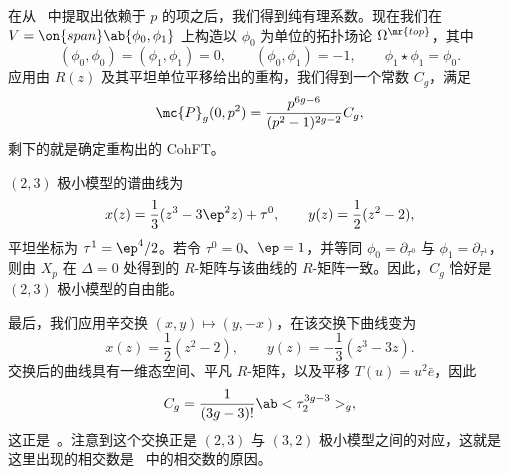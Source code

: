 在从~ 中提取出依赖于 \(p\) 的项之后，我们得到纯有理系数。现在我们在 \(V = \on{span}\ab\{\phi_0,\phi_1\}\) 上构造以 \(\phi_0\) 为单位的拓扑场论 \(\Omega^{\mr{top}}\)，其中
\[ (\phi_0,\phi_0) = (\phi_1,\phi_1) = 0, \qquad (\phi_0,\phi_1) = -1, \qquad \phi_1 \star \phi_1 = \phi_0. \]
应用由 \(R(z)\) 及其平坦单位平移给出的重构，我们得到一个常数 \(C_g\)，满足
\[ \mc{P}_g(0,p^2) = \frac{p^{6g-6}}{(p^2-1)^{2g-2}}C_g, \]
剩下的就是确定重构出的 CohFT。

\((2,3)\) 极小模型的谱曲线为
\[ x(z) = \frac{1}{3}(z^3-3\ep^2 z) + \tau^0, \qquad y(z) = \frac{1}{2}(z^2-2), \]
平坦坐标为 \(\tau^1 = \ep^4/2\)。若令 \(\tau^0 = 0\)、\(\ep = 1\)，并等同 \(\phi_0 = \partial_{\tau^0}\) 与 \(\phi_1 = \partial_{\tau^1}\)，则由 \(X_p\) 在 \(\Delta = 0\) 处得到的 \(R\)-矩阵与该曲线的 \(R\)-矩阵一致。因此，\(C_g\) 恰好是 \((2,3)\) 极小模型的自由能。

最后，我们应用辛交换 \((x,y) \mapsto (y,-x)\)，在该交换下曲线变为
\[ x(z) = \frac{1}{2}(z^2-2), \qquad y(z) = -\frac{1}{3}(z^3-3z). \]
交换后的曲线具有一维态空间、平凡 \(R\)-矩阵，以及平移 \(T(u) = u^2 \bar{e}\)，因此
\[ C_g = \frac{1}{(3g-3)!}\ab<\tau_2^{3g-3}>_g, \]
这正是~。注意到这个交换正是 \((2,3)\) 与 \((3,2)\) 极小模型之间的对应，这就是这里出现的相交数是~ 中的相交数的原因。

